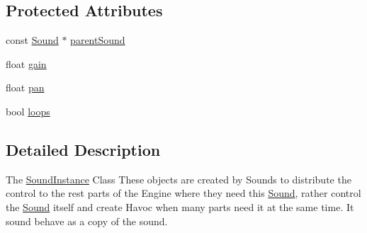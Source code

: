 \subsection*{Protected Attributes}
\begin{DoxyCompactItemize}
\item 
const \hyperlink{classZeta_1_1Sound}{Sound} $\ast$ \hyperlink{classZeta_1_1SoundInstance_a1a11c5a5c711141061cda151207eb730}{parent\+Sound}
\item 
float \hyperlink{classZeta_1_1SoundInstance_acb82c5783574e56f82116574bea15e6d}{gain}
\item 
float \hyperlink{classZeta_1_1SoundInstance_a7635755856cabd34dd383bf8edddfdbb}{pan}
\item 
bool \hyperlink{classZeta_1_1SoundInstance_a22ccff32fba2ad1ea881a186c86f93c0}{loops}
\end{DoxyCompactItemize}


\subsection{Detailed Description}
The \hyperlink{classZeta_1_1SoundInstance}{Sound\+Instance} Class These objects are created by Sounds to distribute the control to the rest parts of the Engine where they need this \hyperlink{classZeta_1_1Sound}{Sound}, rather control the \hyperlink{classZeta_1_1Sound}{Sound} itself and create Havoc when many parts need it at the same time. It sound behave as a copy of the sound. 


